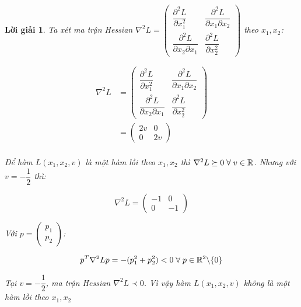 \documentclass[14pt, a4paper]{article}
\theoremstyle{sltheorem}
\theoremstyle{soltheorem}
\newtheorem*{loigiai}{Lời giải}
\begin{document}
\begin{loigiai}
        Ta xét ma trận Hessian $\nabla^2 L= \begin{pmatrix} \dfrac{\partial^2 L}{\partial x_1^2} & \dfrac{\partial^2 L}{\partial x_1 \partial x_2} \\ \dfrac{\partial^2 L}{\partial x_2 \partial x_1} & \dfrac{\partial^2 L}{\partial x_2^2} \end{pmatrix} $ theo $x_1, x_2$:

        \begin{equation*}
            \begin{aligned}
                \nabla^2 L &= \begin{pmatrix} \dfrac{\partial^2 L}{\partial x_1^2} & \dfrac{\partial^2 L}{\partial x_1 \partial x_2} \\ \dfrac{\partial^2 L}{\partial x_2 \partial x_1} & \dfrac{\partial^2 L}{\partial x_2^2} \end{pmatrix} \\
                &= \begin{pmatrix} 2v & 0 \\ 0 & 2v \end{pmatrix} \\
            \end{aligned}
        \end{equation*}

        Để hàm $L(x_1, x_2, v)$ là một hàm lồi theo $x_1, x_2$ thì $\nabla^2 L \succeq 0 \thickspace \forall \thickspace v \in \mathbb{R}$. 
        Nhưng với $v=-\dfrac{1}{2}$ thì:

        \begin{equation*}
            \nabla^2 L = \begin{pmatrix}
                -1 & 0 \\ 0 & -1
            \end{pmatrix}
        \end{equation*}

        Với $p=\begin{pmatrix}
            p_1 \\ p_2
        \end{pmatrix}$:

        \begin{equation*}
            p^T \nabla^2 L p = -(p_1^2 + p_2^2) < 0 \thickspace \forall \thickspace p \in \mathbb{R}^2 \backslash \lbrace 0 \rbrace
        \end{equation*}

        Tại $v=-\dfrac{1}{2}$, ma trận Hessian $\nabla^2 L \prec 0$. Vì vậy hàm $L(x_1, x_2, v)$ không là một hàm lồi theo $x_1, x_2$


\end{loigiai}
\end{document}
